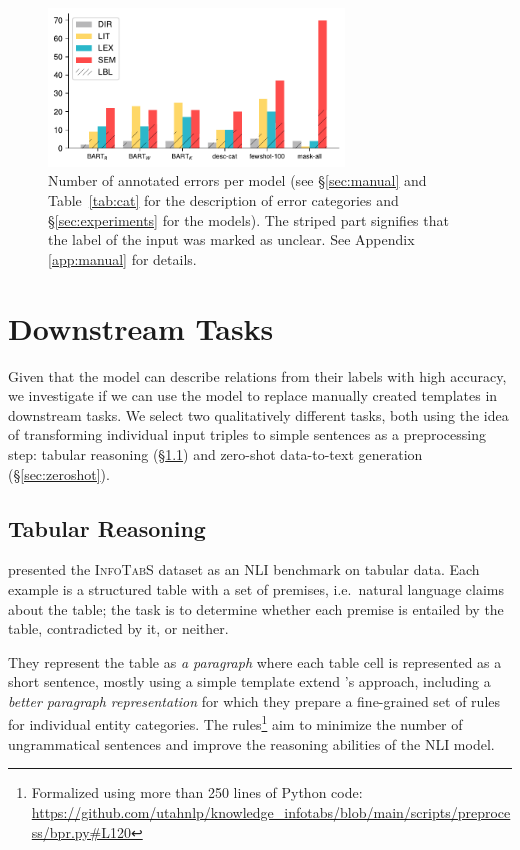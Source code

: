 \begin{figure}[t]
    \centering
    \includegraphics[width=0.7\textwidth]{img/rel2text-graph.pdf}
    \caption{Number of annotated errors per model (see §\ref{sec:manual} and Table~\ref{tab:cat} for the description of error categories and §\ref{sec:experiments} for the models). The striped part signifies that the label of the input was marked as unclear. See Appendix \ref{app:manual} for details.}\label{fig:manual}
\end{figure}




\section{Downstream Tasks}
\label{sec:downstream}
Given that the \BARTr{} model can describe relations from their labels with high accuracy, we investigate if we can use the model to replace manually created templates in downstream tasks. We select two qualitatively different tasks, both using the idea of transforming individual input triples to simple sentences as a preprocessing step: tabular reasoning (§\ref{sec:tab_res}) and zero-shot data-to-text generation (§\ref{sec:zeroshot}).

\subsection{Tabular Reasoning}
\label{sec:tab_res}

\citet{gupta2020infotabs} presented the \textsc{InfoTabS} dataset as an NLI benchmark on tabular data. Each example is a structured table with a set of premises, i.e.\ natural language claims about the table; the task is to determine whether each premise is entailed by the table, contradicted by it, or neither.

They represent the table as \textit{a paragraph} where each table cell is represented as a short sentence, mostly using a simple template  \citet{neeraja2021incorporating} extend \citeauthor{gupta2020infotabs}'s approach, including a \textit{better paragraph representation} for which they prepare a fine-grained set of rules for individual entity categories. The rules\footnote{Formalized using more than 250 lines of Python code: \url{https://github.com/utahnlp/knowledge\_infotabs/blob/main/scripts/preprocess/bpr.py\#L120}} aim to minimize the number of ungrammatical sentences and improve the reasoning abilities of the NLI model.

